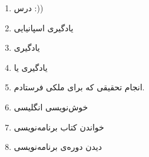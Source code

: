 \documentclass{article}
\begin{document}
\begin{enumerate}
	\item 
	درس :))
	\item 
	یادگیری اسپانیایی
	\item 
	یادگیری 
	\item 
	یادگیری  یا 
	\item 
	انجام تحقیقی که برای ملکی فرستادم.
	\item 
	خوش‌نویسی انگلیسی
	\item 
	خواندن کتاب برنامه‌نویسی
	\item 
	دیدن دوره‌ی برنامه‌نویسی
\end{enumerate}				
\end{document}
